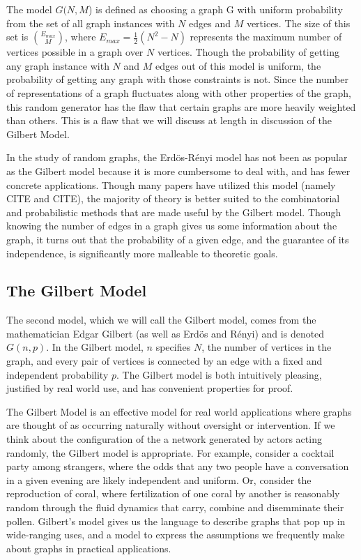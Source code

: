 \documentclass[11pt,a4paper]{report}
\begin{document}
The model $G(N, M$) is defined as choosing a graph G with uniform probability from the set of all graph instances with $N$ edges and $M$ vertices.
The size of this set is $\binom{E_{max}}{M}$, where $E_{max} = \frac{1}{2}(N^2 - N)$ represents the maximum number of vertices possible in a graph over $N$ vertices.
Though the probability of getting any graph instance with $N$ and $M$ edges out of this model is uniform, the probability of getting any graph with those constraints is not.
Since the number of representations of a graph fluctuates along with other properties of the graph, this random generator has the flaw that certain graphs are more heavily weighted than others.
This is a flaw that we will discuss at length in discussion of the Gilbert Model.

In the study of random graphs, the Erd\"os-R\'enyi model has not been as popular as the Gilbert model because it is more cumbersome to deal with, and has fewer concrete applications.
Though many papers have utilized this model (namely CITE and CITE), the majority of theory is better suited to the combinatorial and probabilistic methods that are made useful by the Gilbert model.
Though knowing the number of edges in a graph gives us some information about the graph, it turns out that the probability of a given edge, and the guarantee of its independence, is significantly more malleable to theoretic goals.

\subsection{The Gilbert Model}

The second model, which we will call the Gilbert model, comes from the mathematician Edgar Gilbert (as well as Erd\"os and R\'enyi) and is denoted $G(n, p)$.
In the Gilbert model, $n$ specifies $N$, the number of vertices in the graph, and every pair of vertices is connected by an edge with a fixed and independent probability $p$.
The Gilbert model is both intuitively pleasing, justified by real world use, and has convenient properties for proof.

The Gilbert Model is an effective model for real world applications where graphs are thought of as occurring naturally without oversight or intervention.
If we think about the configuration of the a network generated by actors acting randomly, the Gilbert model is appropriate.
For example, consider a cocktail party among strangers, where the odds that any two people have a conversation in a given evening are likely independent and uniform.
Or, consider the reproduction of coral, where fertilization of one coral by another is reasonably random through the fluid dynamics that carry, combine and disemminate their pollen.
Gilbert's model gives us the language to describe graphs that pop up in wide-ranging uses, and a model to express the assumptions we frequently make about graphs in practical applications.
\end{document}
